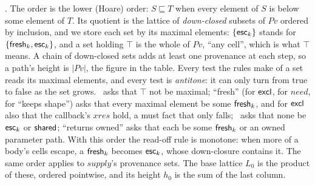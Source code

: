 \Known. The order is the lower (Hoare) order: $S
\sqsubseteq T$ when every element of $S$ is below some element of $T$. Its quotient is the lattice of
\emph{down-closed} subsets of $\mathit{Pv}$ ordered by inclusion, and we store each set by its maximal
elements: $\{\mathsf{esc}_k\}$ stands for $\{\mathsf{fresh}_k, \mathsf{esc}_k\}$, and a set holding $\top$ is the whole of
$\mathit{Pv}$, ``any cell'', which is what $\top$ means. A chain of down-closed sets adds at least one
provenance at each step, so a path's height is $|\mathit{Pv}|$, the figure in the table. Every test the
rules make of a set reads its maximal elements, and every test is \emph{antitone}: it can only turn
from true to false as the set grows. \Known\ asks that $\top$ not be maximal; ``fresh'' (for
$\mathsf{excl}$, for $\mathit{need}$, for ``keeps shape'') asks that every maximal element be some
$\mathsf{fresh}_k$, and for $\mathsf{excl}$ also that the callback's $\mathit{xres}$ hold, a must fact that only falls;
\Unescaped\ asks that none be $\mathsf{esc}_k$ or $\mathsf{shared}$; ``returns owned'' asks that each be
some $\mathsf{fresh}_k$ or an owned parameter path. With this order the read-off rule is
monotone: when more of a body's cells escape, a $\mathsf{fresh}_k$ becomes $\mathsf{esc}_k$, whose down-closure contains
it. The same order applies to $\mathit{supply}$'s provenance sets. The base lattice $L_0$ is the product of these, ordered
pointwise, and its height $h_0$ is the sum of the last column.

